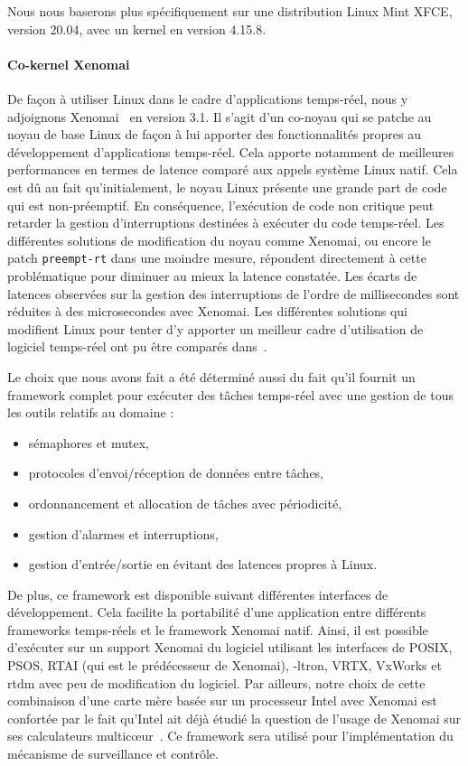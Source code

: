 \documentclass[french, a4paper, 11pt, twoside, pdftex]{StyleThese}
\begin{document}
        Nous nous baserons plus spécifiquement sur une distribution Linux Mint XFCE, version 20.04, avec un kernel en version 4.15.8.
        
        \paragraph{Co-kernel Xenomai}
        De façon à utiliser Linux dans le cadre d'applications temps-réel, nous y adjoignons Xenomai~\cite{gerum_xenomai_2004} en version 3.1. Il s'agit d'un co-noyau qui se patche au noyau de base Linux de façon à lui apporter des fonctionnalités propres au développement d'applications temps-réel. Cela apporte notamment de meilleures performances en termes de latence comparé aux appels système Linux natif. Cela est dû au fait qu'initialement, le noyau Linux présente une grande part de code qui est non-préemptif. En conséquence, l'exécution de code non critique peut retarder la gestion d'interruptions destinées à exécuter du code temps-réel. Les différentes solutions de modification du noyau comme Xenomai, ou encore le patch \texttt{preempt-rt} dans une moindre mesure, répondent directement à cette problématique pour diminuer au mieux la latence constatée. Les écarts de latences observées sur la gestion des interruptions de l'ordre de millisecondes sont réduites à des microsecondes avec Xenomai. Les différentes solutions qui modifient Linux pour tenter d'y apporter un meilleur cadre d'utilisation de logiciel temps-réel ont pu être comparés dans~\cite{brown_how_2010}. 
        
        Le choix que nous avons fait a été déterminé aussi du fait qu'il fournit un framework complet pour exécuter des tâches temps-réel avec une gestion de tous les outils relatifs au domaine : \begin{itemize}
        	\item sémaphores et mutex,
        	\item protocoles d'envoi/réception de données entre tâches,
        	\item ordonnancement et allocation de tâches avec périodicité,
        	\item gestion d'alarmes et interruptions,
        	\item gestion d'entrée/sortie en évitant des latences propres à Linux.
        	\end{itemize}
    	De plus, ce framework est disponible suivant différentes interfaces de développement. Cela facilite la portabilité d'une application entre différents frameworks temps-réels et le framework Xenomai natif. Ainsi, il est possible d'exécuter sur un support Xenomai du logiciel utilisant les interfaces de POSIX, PSOS, RTAI (qui est le prédécesseur de Xenomai), \textmu-ltron, VRTX, VxWorks et rtdm avec peu de modification du logiciel. Par ailleurs, notre choix de cette combinaison d'une carte mère basée sur un processeur Intel avec Xenomai est confortée par le fait qu'Intel ait déjà étudié la question de l'usage de Xenomai sur ses calculateurs multicœur~\cite{intel_corporation_hard_2009}. Ce framework sera utilisé pour l'implémentation du mécanisme de surveillance et contrôle.
    	
\end{document}
